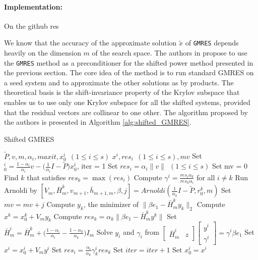 \paragraph{Implementation:} On the github res

\noindent We know that the accuracy of the approximate solution $\tilde x$ of \texttt{GMRES} depends heavily on the dimension $m$ of the search space. The authors in \cite{SHEN2022126799} propose to use the \texttt{GMRES} method as a preconditioner for the shifted power method presented in the previous section. The core idea of the method is to run standard GMRES on a seed system and to approximate the other solutions as by products. The theoretical basis is the shift-invariance property of the Krylov subspace that enables us to use only one Krylov subspace for all the shifted systems, provided that the residual vectors are collinear to one other. The algorithm proposed by the authors is presented in Algorithm \ref{alg:shifted_GMRES}.

\begin{algorithm}[H]
\caption{Shifted GMRES}
\label{alg:shifted_GMRES}
\begin{algorithmic}[1]
    \Require $\tilde P, v, m, \alpha_i, maxit, x_0^i ~~ (1 \leq i \leq s)$
    \Ensure $x^i, res_i ~~(1 \leq i \leq s), mv$
    \State Set $_0^i = \frac{1-\alpha_i}{\alpha_i} v - \Big(\frac{1}{\alpha_i} I - \tilde P \Big) x_0^i$, iter = 1
    \State Set $res_i = \alpha_i \lVert v \rVert ~~ (1 \leq i \leq s)$
    \State Set mv = 0
        \State Find $k$ that satisfies $res_k = \max (res_i)$
        \State Compute $\gamma^i = \frac{res_i \alpha_k}{res_k \alpha_i}$ for all $i \neq k$
        \State Run Arnoldi by $ [V_m, \bar H_m^k, v_{m+1}, \bar h_{m+1,m}, \beta, j] = Arnoldi(\frac{1}{\alpha_k}I - \tilde P, r_0^k, m)$
        \State Set $mv = mv + j$
        \State Compute $y_k$, the minimizer of $\lVert \beta e_1 - \bar H_m^k y_k \rVert_2$
        \State Compute $x^k = x_0^k + V_m y_k$
        \State Compute $res_k = \alpha_k \lVert \beta e_1 - \bar H_m^k y^k \rVert$
                \State Set $\bar H_m^i = \bar H_m^k + \Big( \frac{1-\alpha_i}{\alpha_i} - \frac{1-\alpha_k}{\alpha_k} \Big) I_m$
                \State Solve $y_i$ and $\gamma_i$ from $\begin{bmatrix} \bar H_m^i & z \end{bmatrix} \begin{bmatrix} y^i \\ \gamma^i \end{bmatrix} = \gamma^i \beta e_1$
                \State Set $x^i = x_0^i + V_m y^i$
                \State Set $res_i = \frac{\alpha_i}{\alpha_k} \gamma_k^i res_k$
            \EndIf
        \EndFor
        \State Set $iter = iter + 1$
        \State Set $x_0^i = x^i$
    \EndWhile
\end{algorithmic}
\end{algorithm}


